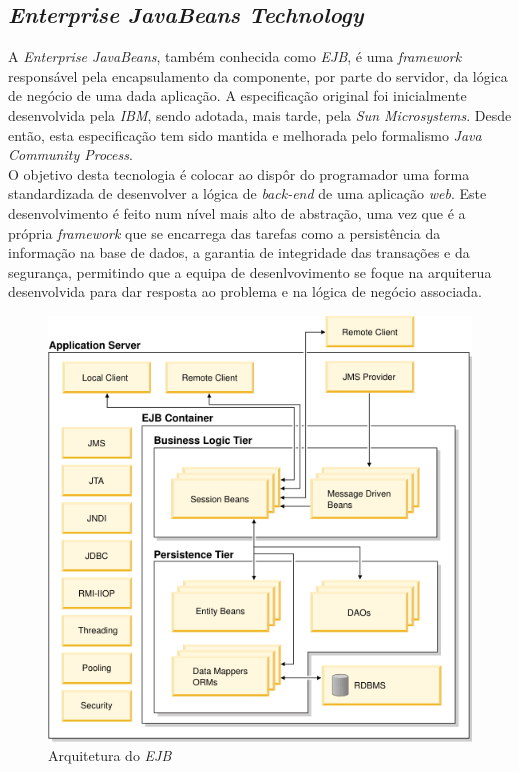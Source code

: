 \subsection{\textit{Enterprise JavaBeans Technology}}

A \textit{Enterprise JavaBeans}, também conhecida como \textit{EJB}, é uma \textit{framework} responsável pela encapsulamento da componente, por parte do servidor, da lógica de negócio de uma dada aplicação.
A especificação original foi inicialmente desenvolvida pela \textit{IBM}, sendo adotada, mais tarde, pela \textit{Sun Microsystems}.
Desde então, esta especificação tem sido mantida e melhorada pelo formalismo \textit{Java Community Process}.\\

O objetivo desta tecnologia é colocar ao dispôr do programador uma forma standardizada de desenvolver a lógica de \textit{back-end} de uma aplicação \textit{web}.
Este desenvolvimento é feito num nível mais alto de abstração, uma vez que é a própria \textit{framework} que se encarrega das tarefas como a persistência da informação na base de dados, a garantia de integridade das transações e da segurança, permitindo que a equipa de desenlvovimento se foque na arquiterua desenvolvida para dar resposta ao problema e na lógica de negócio associada.\\

\begin{figure}[!h]
\centering
\includegraphics[scale=.4]{img/ejb}
\caption{Arquitetura do \textit{EJB}}
\end{figure}

